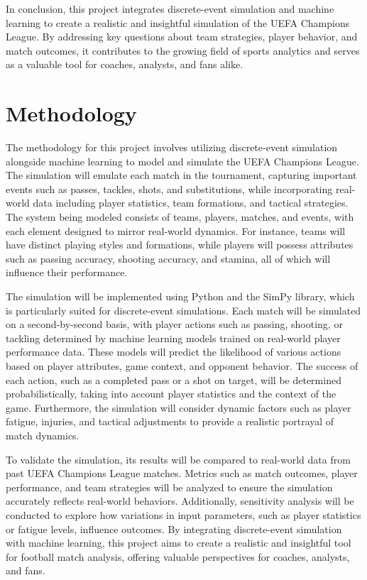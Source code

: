 \documentclass[12pt]{article}
\begin{document}
In conclusion, this project integrates discrete-event simulation and machine learning to create a realistic and insightful simulation of the UEFA Champions League. By addressing key questions about team strategies, player behavior, and match outcomes, it contributes to the growing field of sports analytics and serves as a valuable tool for coaches, analysts, and fans alike.

\section{Methodology}
The methodology for this project involves utilizing discrete-event simulation alongside machine learning to model and simulate the UEFA Champions League. The simulation will emulate each match in the tournament, capturing important events such as passes, tackles, shots, and substitutions, while incorporating real-world data including player statistics, team formations, and tactical strategies. The system being modeled consists of teams, players, matches, and events, with each element designed to mirror real-world dynamics. For instance, teams will have distinct playing styles and formations, while players will possess attributes such as passing accuracy, shooting accuracy, and stamina, all of which will influence their performance.

The simulation will be implemented using Python and the SimPy library, which is particularly suited for discrete-event simulations. Each match will be simulated on a second-by-second basis, with player actions such as passing, shooting, or tackling determined by machine learning models trained on real-world player performance data. These models will predict the likelihood of various actions based on player attributes, game context, and opponent behavior. The success of each action, such as a completed pass or a shot on target, will be determined probabilistically, taking into account player statistics and the context of the game. Furthermore, the simulation will consider dynamic factors such as player fatigue, injuries, and tactical adjustments to provide a realistic portrayal of match dynamics.

To validate the simulation, its results will be compared to real-world data from past UEFA Champions League matches. Metrics such as match outcomes, player performance, and team strategies will be analyzed to ensure the simulation accurately reflects real-world behaviors. Additionally, sensitivity analysis will be conducted to explore how variations in input parameters, such as player statistics or fatigue levels, influence outcomes. By integrating discrete-event simulation with machine learning, this project aims to create a realistic and insightful tool for football match analysis, offering valuable perspectives for coaches, analysts, and fans.
\end{document}
